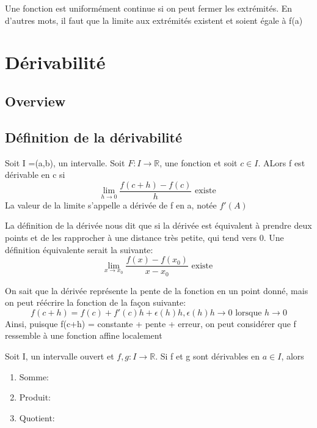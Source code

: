 \documentclass{article}
\begin{document}
\begin{problem}
    Une fonction est uniformément continue si on peut fermer les extrémités. En
    d'autres mots, il faut que la limite aux extrémités existent et soient
    égale à f(a)
\end{problem}

\pagebreak

\section{Dérivabilité}

\subsection{Overview}

\subsection{Définition de la dérivabilité}

\begin{definition}[Dérivée]
    Soit I =(a,b), un intervalle. Soit $F:I \to \mathbb{R}$, une fonction
    et soit $ c \in I$. ALors f est dérivable en c si
    $$ \lim_{h \to 0} \frac{f(c+h) -f(c)}{h} \text{ existe } $$
    La valeur de la limite s'appelle a dérivée de f en a, notée $f'(A)$
\end{definition}

\begin{remark}
    La définition de la dérivée nous dit que si la dérivée est équivalent
    à prendre deux points et de les rapprocher à une distance très petite,
    qui tend vers 0. Une définition équivalente serait la suivante:
    $$ \lim_{x \to x_0} \frac{f(x) -f(x_0)}{x - x_0} \text{ existe } $$
\end{remark}

\begin{remark}
    On sait que la dérivée représente la pente de la fonction en un
    point donné, mais on peut réécrire la fonction de la façon suivante:
    $$ f(c+h) = f(c) + f'(c)h + \epsilon (h)h, \epsilon (h)h \to 0
    \text{ lorsque } h \to 0$$
    Ainsi, puisque f(c+h) = constante + pente + erreur, on peut considérer
    que f ressemble à une fonction affine localement
\end{remark}

\begin{theorem}
    Soit I, un intervalle ouvert et $f,g:I \to \mathbb{R}$. Si f et g
    sont dérivables en $a \in I$, alors
    \begin{enumerate}
	\item Somme:
	\item Produit:
	\item Quotient:
    \end{enumerate}
\end{theorem}
\end{document}
